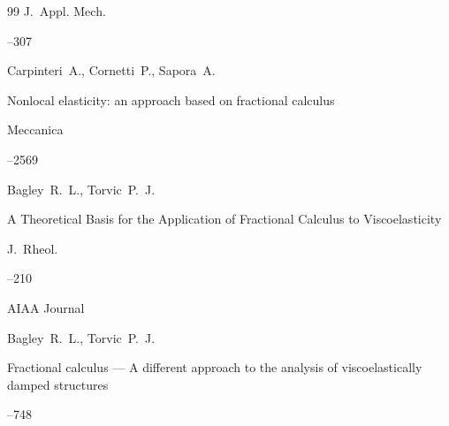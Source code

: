 \begin{thebibliography}{99}
\jour J.~Appl. Mech. 




--307







\by Carpinteri~A., Cornetti~P., Sapora~A.

\paper Nonlocal elasticity: an approach based on fractional calculus

\jour Meccanica




--2569







\by Bagley~R.~L., Torvic~P.~J.

\paper  A Theoretical Basis for the Application of Fractional Calculus to Viscoelasticity 

\jour J.~Rheol.





--210







\jour  AIAA Journal

\by Bagley~R.~L., Torvic~P.~J.

\paper Fractional calculus --- A different approach to the analysis of viscoelastically damped structures




--748







\end{thebibliography}
